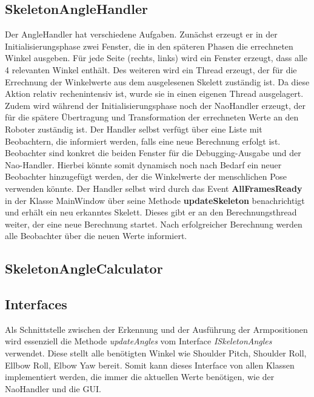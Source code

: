 \subsection{SkeletonAngleHandler}
Der AngleHandler hat verschiedene Aufgaben. Zunächst erzeugt er in der Initialisierungsphase zwei Fenster, die in den späteren Phasen die errechneten Winkel ausgeben. Für jede Seite (rechts, links) wird ein Fenster erzeugt, dass alle 4 relevanten Winkel enthält. Des weiteren wird ein Thread erzeugt, der für die Errechnung der Winkelwerte aus dem ausgelesenen Skelett zuständig ist. Da diese Aktion relativ rechenintensiv ist, wurde sie in einen eigenen Thread ausgelagert. Zudem wird während der Initialisierungsphase noch der NaoHandler erzeugt, der für die spätere Übertragung und Transformation der errechneten Werte an den Roboter zuständig ist.
Der Handler selbst verfügt über eine Liste mit Beobachtern, die informiert werden, falls eine neue Berechnung erfolgt ist. Beobachter sind konkret die beiden Fenster für die Debugging-Ausgabe und der Nao-Handler. Hierbei könnte somit dynamisch noch nach Bedarf ein neuer Beobachter hinzugefügt werden, der die Winkelwerte der menschlichen Pose verwenden könnte.
Der Handler selbst wird durch das Event \textbf{AllFramesReady} in der Klasse MainWindow über seine Methode \textbf{updateSkeleton} benachrichtigt und erhält ein neu erkanntes Skelett. Dieses gibt er an den Berechnungsthread weiter, der eine neue Berechnung startet. Nach erfolgreicher Berechnung werden alle Beobachter über die neuen Werte informiert. 

%
%

\subsection{SkeletonAngleCalculator}





\subsection{Interfaces}
Als Schnittstelle zwischen der Erkennung und der Ausführung der Armpositionen wird essenziell die Methode \textit{updateAngles} vom Interface \textit{ISkeletonAngles} verwendet. Diese stellt alle benötigten Winkel wie Shoulder Pitch, Shoulder Roll, Ellbow Roll, Elbow Yaw bereit. Somit kann dieses Interface von allen Klassen implementiert werden, die immer die aktuellen Werte benötigen, wie der NaoHandler und die GUI.


